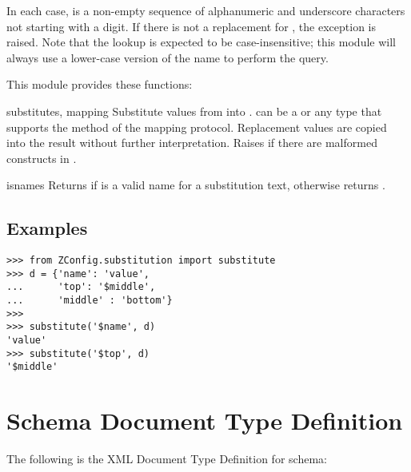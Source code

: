 \documentclass{howto}
\begin{document}
In each case,  is a non-empty sequence of alphanumeric and
underscore characters not starting with a digit.  If there is not a
replacement for , the exception
 is raised.
Note that the lookup is expected to be case-insensitive; this module
will always use a lower-case version of the name to perform the query.

This module provides these functions:

\begin{funcdesc}{substitute}{s, mapping}
  Substitute values from  into .  
  can be a  or any type that supports the 
  method of the mapping protocol.  Replacement
  values are copied into the result without further interpretation.
  Raises  if there are malformed
  constructs in .
\end{funcdesc}

\begin{funcdesc}{isname}{s}
  Returns  if  is a valid name for a substitution
  text, otherwise returns .
\end{funcdesc}


\subsection{Examples}

\begin{verbatim}
>>> from ZConfig.substitution import substitute
>>> d = {'name': 'value',
...      'top': '$middle',
...      'middle' : 'bottom'}
>>>
>>> substitute('$name', d)
'value'
>>> substitute('$top', d)
'$middle'
\end{verbatim}


\appendix
\section{Schema Document Type Definition \label{schema-dtd}}

The following is the XML Document Type Definition for 
schema:


\end{document}
